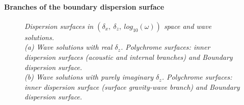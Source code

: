 \paragraph{Branches of the boundary dispersion surface}
%
\begin{figure}[h]
	\centering
	\centering		
	\caption{\textit{Dispersion surfaces in $(\delta_x,\ \delta_z,\ log_{10}(\omega))$  space and wave solutions.\\
			 (a) Wave solutions with real $\delta_z$. Polychrome surfaces: inner dispersion surfaces (acoustic and internal branches) and Boundary dispersion surface.\\
			 (b) Wave solutions with purely imaginary $\delta_z$. Polychrome surfaces: inner dispersion surface (surface gravity-wave branch) and Boundary dispersion surface.
	}
}
\label{FigDispSolutions}
\end{figure}

